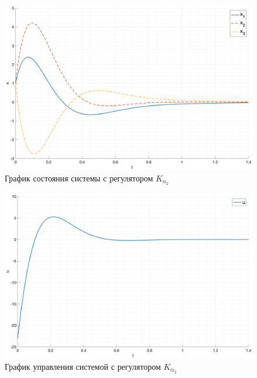 \begin{figure}[ht!]
    \centering
    \includegraphics[width=\textwidth]{media/plots/task1_2_x.png}
    \caption{График состояния системы с регулятором $K_{\alpha_2}$}
    \label{fig:task1_2_x}
\end{figure}
\begin{figure}[ht!]
    \centering
    \includegraphics[width=\textwidth]{media/plots/task1_2_u.png}
    \caption{График управления системой с регулятором $K_{\alpha_2}$}
    \label{fig:task1_2_u}
\end{figure}
\FloatBarrier

